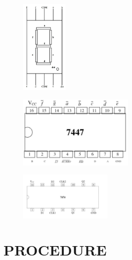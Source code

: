 \documentclass[conference]{IEEEtran}
\begin{document}
\begin{figure}[h]                           
\centering                                 
\includegraphics[width=0.2\textwidth]{ 2.jpg}                                           
\caption{\label{fig-1:Gates}}               
\end{figure}
\begin{figure}[h]                           
\centering                            
\includegraphics[width=0.5\textwidth]{3.jpg }                      
\caption{\label{fig-2:Gates}}           
\end{figure}

\begin{figure}[h]                           
\centering                                 
\includegraphics[width=0.4\textwidth]{ 4.jpg  }                                           
\caption{\label{fig-3:Gates}}               
\end{figure}

\section{PROCEDURE}
\end{document}
